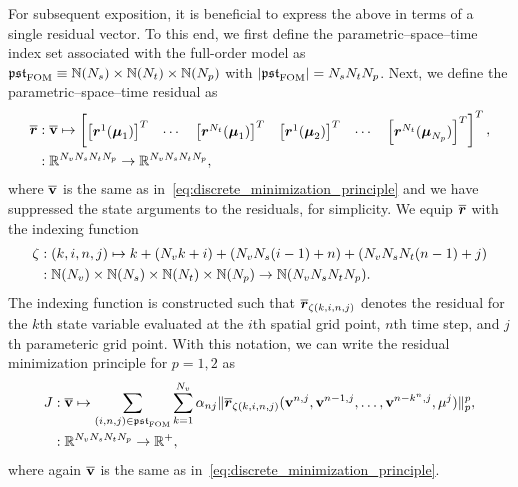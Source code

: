 \documentclass[3p,computermodern,10pt]{elsarticle}
\begin{document}
For subsequent exposition, it is beneficial to express the above in terms of a single residual vector. To this end, we first define the parametric--space--time index set associated with the full-order model as $\mathfrak{pst}_{\text{FOM}} \equiv \mathbb{N}(N_s) \times \mathbb{N}(N_t) \times \mathbb{N}(N_p)$ with $|\mathfrak{pst}_{\text{FOM}}| =  N_s N_t N_p$. Next, we define the parametric--space--time residual as
\begin{equation*}
\begin{split}
\overline{\boldsymbol{r}} &: \overline{\mathbf{v}} \mapsto
\begin{bmatrix}
\left[\boldsymbol{r}^1(\boldsymbol \mu_1) \right]^T & \cdots & \left[ \boldsymbol{r}^{N_t}(\boldsymbol \mu_1) \right]^T & \left[  \boldsymbol{r}^{1}(\boldsymbol \mu_2) \right]^T & \cdots & \left[  \boldsymbol{r}^{N_t}(\boldsymbol \mu_{N_p}) \right]^T 
\end{bmatrix}^T, \\
&: \mathbb{R}^{N_v N_s N_t N_p} \rightarrow \mathbb{R}^{N_v N_s N_t N_p},
\end{split}
\end{equation*}
where $\overline{\mathbf{v}}$ is the same as in~\eqref{eq:discrete_minimization_principle} and we have suppressed the state arguments to the residuals, for simplicity. We equip $\overline{\boldsymbol{r}}$ with the indexing function
\begin{equation*}
\begin{split}
 \zeta &: (k,i,n,j) \mapsto k + (N_v k  + i) + (N_v N_s (i-1) + n) + (N_v N_s N_t (n-1) + j)\\
       &: \mathbb{N}(N_v) \times \mathbb{N}(N_s) \times \mathbb{N}(N_t) \times \mathbb{N}(N_p) \rightarrow \mathbb{N}(N_v N_s N_t N_p) .
\end{split}
\end{equation*}
The indexing function is constructed such that $\overline{\boldsymbol{r}}_{\zeta(k,i,n,j)}$ denotes the residual for the $k$th state variable evaluated at the $i$th spatial grid point, $n$th time step, and $j$th parameteric grid point. With this notation, we can write the residual minimization principle for $p=1,2$ as 
\begin{equation}\label{eq:discrete_minimization_principle_sums}
\begin{split}
J &: \overline{\mathbf{v}}  \mapsto \sum_{(i,n,j)\in \mathfrak{pst}_{\text{FOM}}}  \sum_{k=1}^{N_v} \alpha_{nj} \| \overline{\boldsymbol{r}}_{\zeta(k,i,n,j)} (\mathbf{v}^{n,j},\mathbf{v}^{n-1,j},\ldots,\mathbf{v}^{n-k^n,j},\mathbf{\mu}^j) \|_{p}^p,\\
&: \mathbb{R}^{N_v N_s N_t N_p} \rightarrow \mathbb{R}^{+},
\end{split}
\end{equation}
where again $\overline{\mathbf{v}}$ is the same as in~\eqref{eq:discrete_minimization_principle}. 
\end{document}
